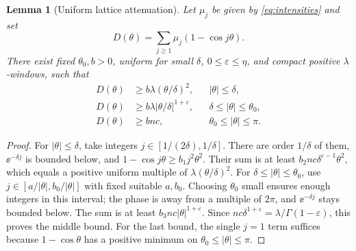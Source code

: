 \documentclass[11pt,a4paper]{article}
\numberwithin{equation}{section}
\newtheorem{lemma}[theorem]{Lemma}
\theoremstyle{definition}
\theoremstyle{remark}
\newcommand{\ep}{\varepsilon}\newcommand{\la}{\lambda}
\begin{document}
\begin{lemma}[Uniform lattice attenuation]\label{lem:lattice}
Let \(\mu_j\) be given by \eqref{eq:intensities} and set
\[
 D(\theta)=\sum_{j\ge1}\mu_j(1-\cos j\theta).
\]
There exist fixed \(\theta_0,b>0\), uniform for small \(\delta\),
\(0\le\ep\le\eta\), and compact positive \(\la\)-windows, such that
\begin{align}
 D(\theta)&\ge b\la(\theta/\delta)^2,
       &&|\theta|\le\delta,\label{eq:atten-small}\\
 D(\theta)&\ge b\la|\theta/\delta|^{1+\ep},
       &&\delta\le|\theta|\le\theta_0,\label{eq:atten-mid}\\
 D(\theta)&\ge bnc,
       &&\theta_0\le|\theta|\le\pi.\label{eq:atten-far}
\end{align}
\end{lemma}
\begin{proof}
For \(|\theta|\le\delta\), take integers
\(j\in[1/(2\delta),1/\delta]\). There are order \(1/\delta\) of them,
\(\ee^{-\delta j}\) is bounded below, and
\(1-\cos j\theta\ge b_1j^2\theta^2\). Their sum is at least
\(b_2nc\delta^{\ep-1}\theta^2\), which equals a positive uniform
multiple of \(\la(\theta/\delta)^2\).
For \(\delta\le|\theta|\le\theta_0\), use
\(j\in[a/|\theta|,b_0/|\theta|]\) with fixed suitable \(a,b_0\).
Choosing \(\theta_0\) small ensures enough integers in this interval;
the phase is away from a multiple of \(2\pi\), and
\(\ee^{-\delta j}\) stays bounded below. The sum is at least
\(b_3nc|\theta|^{1+\ep}\). Since
\(nc\delta^{1+\ep}=\la/\Gamma(1-\ep)\), this proves the middle bound.
For the last bound, the single \(j=1\) term suffices because
\(1-\cos\theta\) has a positive minimum on
\(\theta_0\le|\theta|\le\pi\).
\end{proof}
\end{document}
